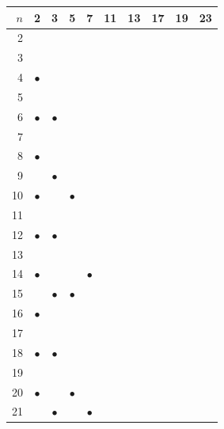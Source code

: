 \documentclass[11pt,a4paper]{amsart}
\theoremstyle{plain}
\theoremstyle{definition}
\theoremstyle{plain}
\theoremstyle{remark}
\begin{document}
\begin{table}[htbp]
\centering
\small
\begin{tabular}{r|ccccc|cccc}
$n$ & 2 & 3 & 5 & 7 & 11 & 13 & 17 & 19 & 23\\ \hline
2  &            &            &            &            &            & & & &\\
3  &            &            &            &            &            & & & &\\
4  & $\bullet$  &            &            &            &            & & & &\\
5  &            &            &            &            &            & & & &\\
6  & $\bullet$  & $\bullet$  &            &            &            & & & &\\
7  &            &            &            &            &            & & & &\\
8  & $\bullet$  &            &            &            &            & & & &\\
9  &            & $\bullet$  &            &            &            & & & &\\
10 & $\bullet$  &            & $\bullet$  &            &            & & & &\\
11 &            &            &            &            &            & & & &\\
12 & $\bullet$  & $\bullet$  &            &            &            & & & &\\
13 &            &            &            &            &            & & & &\\
14 & $\bullet$  &            &            & $\bullet$  &            & & & &\\
15 &            & $\bullet$  & $\bullet$  &            &            & & & &\\
16 & $\bullet$  &            &            &            &            & & & &\\
17 &            &            &            &            &            & & & &\\
18 & $\bullet$  & $\bullet$  &            &            &            & & & &\\
19 &            &            &            &            &            & & & &\\
20 & $\bullet$  &            & $\bullet$  &            &            & & & &\\
21 &            & $\bullet$  &            & $\bullet$  &            & & & &\\

\end{tabular}
\end{table}
\end{document}
